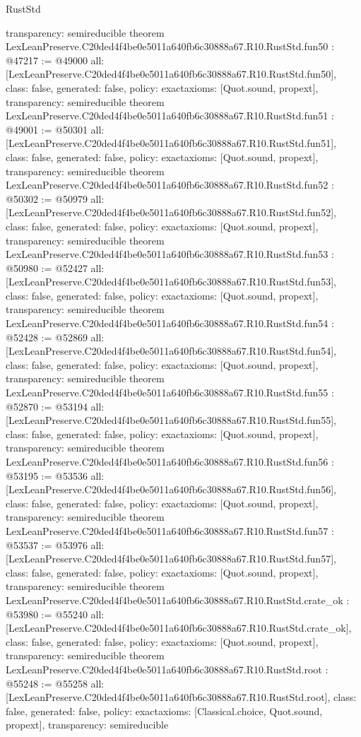 \begin{lexlean}{RustStd}
\begin{coremodule}
{  transparency: semireducible
}
theorem LexLeanPreserve.C20ded4f4be0e5011a640fb6c30888a67.R10.RustStd.fun50 : @47217 := @49000 {
  all: [LexLeanPreserve.C20ded4f4be0e5011a640fb6c30888a67.R10.RustStd.fun50],
  class: false,
  generated: false,
  policy: exact{axioms: [Quot.sound, propext]},
  transparency: semireducible
}
theorem LexLeanPreserve.C20ded4f4be0e5011a640fb6c30888a67.R10.RustStd.fun51 : @49001 := @50301 {
  all: [LexLeanPreserve.C20ded4f4be0e5011a640fb6c30888a67.R10.RustStd.fun51],
  class: false,
  generated: false,
  policy: exact{axioms: [Quot.sound, propext]},
  transparency: semireducible
}
theorem LexLeanPreserve.C20ded4f4be0e5011a640fb6c30888a67.R10.RustStd.fun52 : @50302 := @50979 {
  all: [LexLeanPreserve.C20ded4f4be0e5011a640fb6c30888a67.R10.RustStd.fun52],
  class: false,
  generated: false,
  policy: exact{axioms: [Quot.sound, propext]},
  transparency: semireducible
}
theorem LexLeanPreserve.C20ded4f4be0e5011a640fb6c30888a67.R10.RustStd.fun53 : @50980 := @52427 {
  all: [LexLeanPreserve.C20ded4f4be0e5011a640fb6c30888a67.R10.RustStd.fun53],
  class: false,
  generated: false,
  policy: exact{axioms: [Quot.sound, propext]},
  transparency: semireducible
}
theorem LexLeanPreserve.C20ded4f4be0e5011a640fb6c30888a67.R10.RustStd.fun54 : @52428 := @52869 {
  all: [LexLeanPreserve.C20ded4f4be0e5011a640fb6c30888a67.R10.RustStd.fun54],
  class: false,
  generated: false,
  policy: exact{axioms: [Quot.sound, propext]},
  transparency: semireducible
}
theorem LexLeanPreserve.C20ded4f4be0e5011a640fb6c30888a67.R10.RustStd.fun55 : @52870 := @53194 {
  all: [LexLeanPreserve.C20ded4f4be0e5011a640fb6c30888a67.R10.RustStd.fun55],
  class: false,
  generated: false,
  policy: exact{axioms: [Quot.sound, propext]},
  transparency: semireducible
}
theorem LexLeanPreserve.C20ded4f4be0e5011a640fb6c30888a67.R10.RustStd.fun56 : @53195 := @53536 {
  all: [LexLeanPreserve.C20ded4f4be0e5011a640fb6c30888a67.R10.RustStd.fun56],
  class: false,
  generated: false,
  policy: exact{axioms: [Quot.sound, propext]},
  transparency: semireducible
}
theorem LexLeanPreserve.C20ded4f4be0e5011a640fb6c30888a67.R10.RustStd.fun57 : @53537 := @53976 {
  all: [LexLeanPreserve.C20ded4f4be0e5011a640fb6c30888a67.R10.RustStd.fun57],
  class: false,
  generated: false,
  policy: exact{axioms: [Quot.sound, propext]},
  transparency: semireducible
}
theorem LexLeanPreserve.C20ded4f4be0e5011a640fb6c30888a67.R10.RustStd.crate_ok : @53980 := @55240 {
  all: [LexLeanPreserve.C20ded4f4be0e5011a640fb6c30888a67.R10.RustStd.crate_ok],
  class: false,
  generated: false,
  policy: exact{axioms: [Quot.sound, propext]},
  transparency: semireducible
}
theorem LexLeanPreserve.C20ded4f4be0e5011a640fb6c30888a67.R10.RustStd.root : @55248 := @55258 {
  all: [LexLeanPreserve.C20ded4f4be0e5011a640fb6c30888a67.R10.RustStd.root],
  class: false,
  generated: false,
  policy: exact{axioms: [Classical.choice, Quot.sound, propext]},
  transparency: semireducible
}


\end{coremodule}
\end{lexlean}
